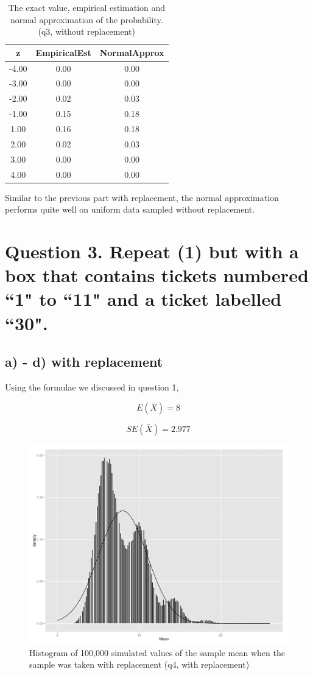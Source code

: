 \documentclass[11pt]{article}
\begin{document}
\begin{table}[H]
\centering
\begin{tabular}{|c|cc|}
  \hline
z & EmpiricalEst & NormalApprox \\ 
  \hline
-4.00 & 0.00 & 0.00 \\ 
  -3.00 & 0.00 & 0.00 \\ 
  -2.00 & 0.02 & 0.03 \\ 
  -1.00 & 0.15 & 0.18 \\ 
  1.00 & 0.16 & 0.18 \\ 
  2.00 & 0.02 & 0.03 \\ 
  3.00 & 0.00 & 0.00 \\ 
  4.00 & 0.00 & 0.00 \\ 
   \hline
\end{tabular}
\caption{The exact value, empirical estimation and normal approximation of the probability.(q3, without replacement)} 
\end{table}


\noindent Similar to the previous part with replacement, the normal approximation performs quite well on uniform data sampled without replacement.



\newpage

 \section*{Question 3. Repeat (1) but with a box that contains tickets numbered ``1" to ``11" and a ticket labelled ``30".}
 
 \subsection*{a) - d) with replacement}
Using the formulae we discussed in question 1,

$$E(\bar{X})= 8$$ 
 
 $$SE(\bar{X}) = 2.977$$

 
\begin{figure}
\centering
\includegraphics[width = .5\textwidth]{histogram_4c-1.pdf}
\caption{Histogram of 100,000 simulated values of the sample mean when the sample was taken with replacement (q4, with replacement)}\label{fig:q4c}
\end{figure}
 
\end{document}
